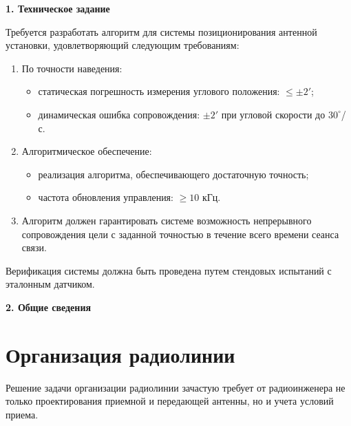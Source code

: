 \newpage

\noindent\textbf{\large 1. Техническое задание}

Требуется разработать алгоритм для системы позиционирования антенной установки, удовлетворяющий следующим требованиям:

\begin{enumerate}[leftmargin=*]
    \item По точности наведения:
    \begin{itemize}[label=--]
        \item статическая погрешность измерения углового положения: $\leq \pm 2'$; 
        \item динамическая ошибка сопровождения: $ \pm 2'$ при  угловой скорости до $30^\circ$/с.
    \end{itemize}

    \item  Алгоритмическое обеспечение:
    \begin{itemize}[label=--]
        \item реализация алгоритма, обеспечивающего достаточную точность;
        \item частота обновления управления: $\geq 10$ кГц.
    \end{itemize}

    \item Алгоритм должен гарантировать системе возможность непрерывного сопровождения цели с заданной точностью 
          в течение всего времени сеанса связи.
  \end{enumerate}
  Верификация системы должна быть проведена путем стендовых испытаний с эталонным датчиком.



\newpage

\noindent\textbf{\large 2. Общие сведения}


\section{Организация радиолинии}

Решение задачи организации радиолинии зачастую требует от радиоинженера не только проектирования приемной и передающей антенны, но и учета условий приема. 

